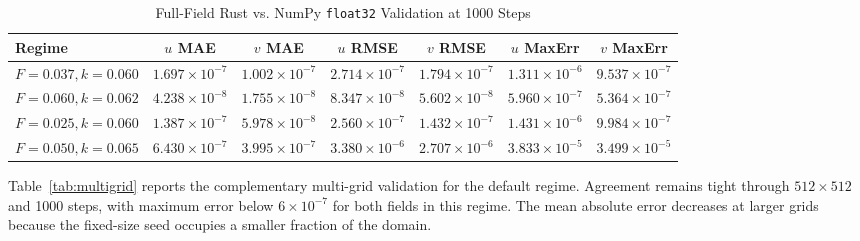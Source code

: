 \documentclass[journal]{IEEEtran}
\begin{document}
\begin{table}[!t]
\renewcommand{\arraystretch}{1.15}
\caption{Full-Field Rust vs. NumPy \texttt{float32} Validation at 1000 Steps}
\label{tab:correctness}
\centering
\begin{tabular}{lcccccc}
\hline
Regime & \(u\) MAE & \(v\) MAE & \(u\) RMSE & \(v\) RMSE & \(u\) MaxErr & \(v\) MaxErr\\
\hline
\(F=0.037, k=0.060\) & \(1.697{\times}10^{-7}\) & \(1.002{\times}10^{-7}\) & \(2.714{\times}10^{-7}\) & \(1.794{\times}10^{-7}\) & \(1.311{\times}10^{-6}\) & \(9.537{\times}10^{-7}\)\\
\(F=0.060, k=0.062\) & \(4.238{\times}10^{-8}\) & \(1.755{\times}10^{-8}\) & \(8.347{\times}10^{-8}\) & \(5.602{\times}10^{-8}\) & \(5.960{\times}10^{-7}\) & \(5.364{\times}10^{-7}\)\\
\(F=0.025, k=0.060\) & \(1.387{\times}10^{-7}\) & \(5.978{\times}10^{-8}\) & \(2.560{\times}10^{-7}\) & \(1.432{\times}10^{-7}\) & \(1.431{\times}10^{-6}\) & \(9.984{\times}10^{-7}\)\\
\(F=0.050, k=0.065\) & \(6.430{\times}10^{-7}\) & \(3.995{\times}10^{-7}\) & \(3.380{\times}10^{-6}\) & \(2.707{\times}10^{-6}\) & \(3.833{\times}10^{-5}\) & \(3.499{\times}10^{-5}\)\\
\hline
\end{tabular}
\end{table}

Table~\ref{tab:multigrid} reports the complementary multi-grid validation for
the default regime. Agreement remains tight through \(512\times512\) and 1000
steps, with maximum error below \(6\times10^{-7}\) for both fields in this
regime. The mean absolute error decreases at larger grids because the fixed-size
seed occupies a smaller fraction of the domain.
\end{document}
